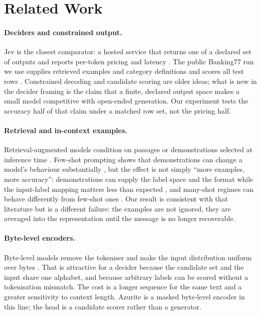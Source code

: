 \documentclass[11pt]{article}
\begin{document}
\section{Related Work}

\paragraph{Deciders and constrained output.}
Jev is the closest comparator: a hosted service that returns one of a declared
set of outputs and reports per-token pricing and latency
\citep{typesafe2026jev}. The public Banking77 run we use supplies retrieved
examples and category definitions and scores all \PN{} test rows
\citep{smith2026jevbanking}. Constrained decoding and candidate scoring are
older ideas; what is new in the decider framing is the claim that a finite,
declared output space makes a small model competitive with open-ended
generation. Our experiment tests the accuracy half of that claim under a
matched row set, not the pricing half.

\paragraph{Retrieval and in-context examples.}
Retrieval-augmented models condition on passages or demonstrations selected at
inference time \citep{karpukhin2020dpr,lewis2020rag}. Few-shot prompting shows
that demonstrations can change a model's behaviour substantially
\citep{brown2020gpt3}, but the effect is not simply ``more examples, more
accuracy'': demonstrations can supply the label space and the format while the
input-label mapping matters less than expected \citep{min2022rethinking}, and
many-shot regimes can behave differently from few-shot ones
\citep{agarwal2024manyshot}. Our result is consistent with that literature but
is a different failure: the examples are not ignored, they are averaged into
the representation until the message is no longer recoverable.

\paragraph{Byte-level encoders.}
Byte-level models remove the tokeniser and make the input distribution uniform
over bytes \citep{xue2022byt5,clark2022canine}. That is attractive for a decider
because the candidate set and the input share one alphabet, and because
arbitrary labels can be scored without a tokenisation mismatch. The cost is a
longer sequence for the same text and a greater sensitivity to context length.
Azurite is a masked byte-level encoder in this line; the head is a candidate
scorer rather than a generator.
\end{document}

